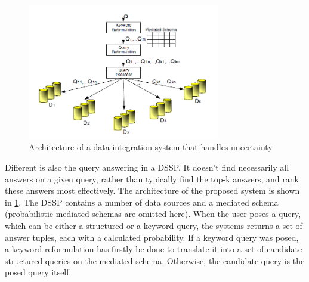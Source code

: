 \begin{figure}[H]
	\begin{center}
		\includegraphics[width=0.75\textwidth]{figures/DataModelingInDSSPs-Figure1.png}
	\end{center}
	\caption{Architecture of a data integration system that handles uncertainty}
	\label{DataModelingInDSSPsFigure1}
\end{figure}

Different is also the query answering in a DSSP. It doesn't find necessarily all answers on a given query, rather than typically find the top-k answers, and rank these answers most effectively. 
The architecture of the proposed system is shown in \ref{DataModelingInDSSPsFigure1}. The DSSP contains a number of data sources and a mediated schema (probabilistic mediated schemas are omitted here). When the user poses a query, which can be either a structured or a keyword query, the systems returns a set of answer tuples, each with a calculated probability. If a keyword query was posed, a keyword reformulation has firstly be done to translate it into a set of candidate structured queries on the mediated schema. Otherwise, the candidate query is the posed query itself.